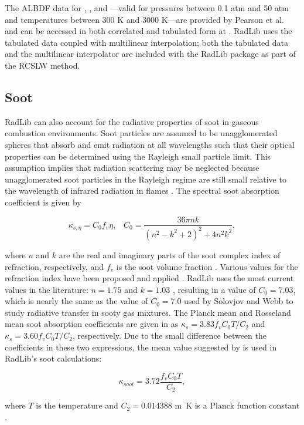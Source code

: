 \documentclass[preprint,12pt]{elsarticle}
\begin{document}
The ALBDF data for , , and ---valid for pressures between 0.1 atm and 50 atm and temperatures between 300 K and 3000 K---are provided by Pearson et al. \cite{Pearson_2014} and can be accessed in both correlated and tabulated form at \cite{Solovjov_2014b}. RadLib uses the tabulated data coupled with multilinear interpolation; both the tabulated data and the multilinear interpolator are included with the RadLib package as part of the RCSLW method.


\subsection{Soot} \label{s:soot}

RadLib can also account for the radiative properties of soot in gaseous combustion environments. Soot particles are assumed to be unagglomerated spheres that absorb and emit radiation at all wavelengths such that their optical properties can be determined using the Rayleigh small particle limit. This assumption implies that radiation scattering may be neglected because unagglomerated soot particles in the Rayleigh regime are still small relative to the wavelength of infrared radiation in flames \cite{Brewster_1992,Solovjov_2001}. The spectral soot absorption coefficient is given by 
%
\begin{linenomath}
\begin{equation}
\label{e:soot1}
	\kappa_{s,\eta}=C_0 f_v \eta, \; \; \; C_0 = \frac{36\pi n k}{(n^2-k^2+2)^2+4n^2k^2},
\end{equation}
\end{linenomath}
%
where $n$ and $k$ are the real and imaginary parts of the soot complex index of refraction, respectively, and $f_v$ is the soot volume fraction \cite{Solovjov_2001,Modest_2013}. Various values for the refraction index have been proposed and applied \cite{Lee_1981,Stull_1960,Dalzell_1969,Howarth_1966,Chang_1990,Felske_1984,Williams_2007}. 
RadLib uses the most current values in the literature: $n=1.75$ and $k=1.03$ \cite{Williams_2007}, resulting in a value of $C_0=7.03$, which is nearly the same as the value of $C_0=7.0$ used by Solovjov and Webb \cite{Solovjov_2001} to study radiative transfer in sooty gas mixtures. 
The Planck mean and Rosseland mean soot absorption coefficients are given in \cite{Modest_2013} as $\kappa_s=3.83f_vC_0T/C_2$ and $\kappa_s=3.60f_vC_0T/C_2$, respectively.
Due to the small difference between the coefficients in these two expressions, the mean value suggested by \cite{Modest_2013,Felske_1977} is used in RadLib's soot calculations:
%
\begin{linenomath}
\begin{equation}
\label{e:soot2}
	\kappa_{soot}=3.72\frac{f_vC_0T}{C_2},
\end{equation}
\end{linenomath}
%
where $T$ is the temperature and $C_2=0.014388$ \si{m.K} is a Planck function constant \cite{Modest_2013}. 
\end{document}
